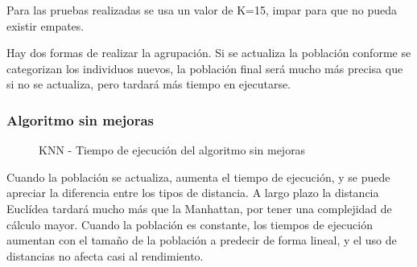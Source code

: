 		
		\begin{flushleft}
		\begin{tcolorbox}[boxrule=0.5pt, fontupper=\small]
			\scriptsize
			Para las pruebas realizadas se usa un valor de K=15, impar para que no pueda existir empates.		
		\end{tcolorbox}		
		\end{flushleft}
		
		
		Hay dos formas de realizar la agrupación. Si se actualiza la población conforme se categorizan los individuos nuevos, la población final será mucho más precisa que si no se actualiza, pero tardará más tiempo en ejecutarse. 
		
		\newpage
		
		\subsubsection{Algoritmo sin mejoras}
		

			\begin{figure}[!h]
				\centering
				\caption{KNN - Tiempo de ejecución del algoritmo sin mejoras }
			\end{figure}

			Cuando la población se actualiza, aumenta el tiempo de ejecución, y se puede apreciar la diferencia entre los tipos de distancia. A largo plazo la distancia Euclídea tardará mucho más que la Manhattan, por tener una complejidad de cálculo mayor. 
			Cuando la población es constante, los tiempos de ejecución aumentan con el tamaño de la población a predecir de forma lineal, y el uso de distancias no afecta casi al rendimiento.
		
